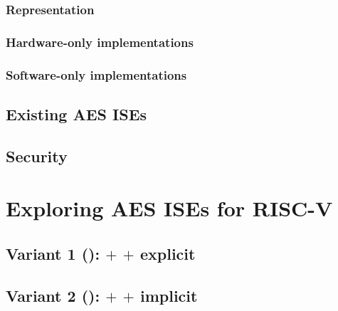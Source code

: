 \documentclass[preprint]{iacrtrans}
\begin{document}
\subsubsection{Representation}
\label{sec:bg:aes_impl_rep}


\subsubsection{Hardware-only implementations}
\label{sec:bg:aes_impl_hw}

\subsubsection{Software-only implementations}
\label{sec:bg:aes_impl_sw}

\subsection{Existing AES ISEs}
\label{sec:bg:aes_impl_ise}


\subsection{Security}
\label{sec:bg:aes_impl_sec}



\section{Exploring AES ISEs for RISC-V}
\label{sec:ise}


\label{sec:ise:design}



\subsection{Variant 1 ():  $+$  $+$ explicit }
\label{sec:ise:design:v1}

\subsection{Variant 2 ():  $+$  $+$ implicit }
\label{sec:ise:design:v2}

\end{document}
